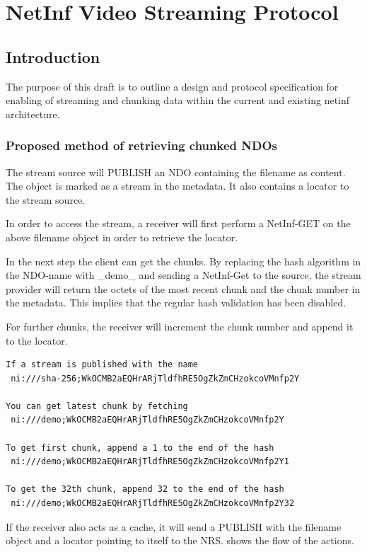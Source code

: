 \section {NetInf Video Streaming Protocol}\label{VideoDraft}

\subsection{Introduction}

The purpose of this draft is to outline a design and protocol specification for enabling of streaming and chunking data within the current and existing netinf architecture.

\subsubsection{Proposed method of retrieving chunked NDOs}

The stream source will PUBLISH an NDO containing the filename as content. The object is marked as a stream in the metadata. It also contains a locator to the stream source.

In order to access the stream, a receiver will first perform a NetInf-GET on the above filename object in order to retrieve the locator. 

In the next step the client can get the chunks. By replacing the hash algorithm in the NDO-name with \_demo\_ and sending a NetInf-Get to the source, the stream provider will return the octets of the most recent chunk and the chunk number in the metadata. This implies that the regular hash validation has been disabled.

For further chunks, the receiver will increment the chunk number and append it to the locator.
\begin{verbatim}
If a stream is published with the name
 ni:///sha-256;WkOCMB2aEQHrARjTldfhRE5OgZkZmCHzokcoVMnfp2Y

You can get latest chunk by fetching
 ni:///demo;WkOCMB2aEQHrARjTldfhRE5OgZkZmCHzokcoVMnfp2Y

To get first chunk, append a 1 to the end of the hash
 ni:///demo;WkOCMB2aEQHrARjTldfhRE5OgZkZmCHzokcoVMnfp2Y1

To get the 32th chunk, append 32 to the end of the hash
 ni:///demo;WkOCMB2aEQHrARjTldfhRE5OgZkZmCHzokcoVMnfp2Y32
\end{verbatim}
 
If the receiver also acts as a cache, it will send a PUBLISH with the filename object and a locator pointing to itself to the NRS.
 shows the flow of the actions. 
\\

